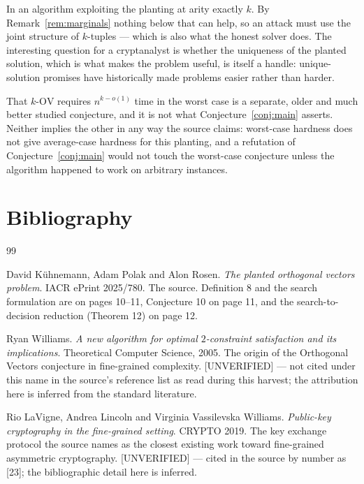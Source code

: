 \documentclass{aicr-conjecture}
\newcommand{\kOV}{k\text{-}\mathrm{OV}}
\begin{document}
\begin{remark}\label{rem:refutation}
In an algorithm exploiting the planting at arity exactly $k$. By
Remark~\ref{rem:marginals} nothing below that can help, so an attack must
use the joint structure of $k$-tuples --- which is also what the honest
solver does. The interesting question for a cryptanalyst is whether the
uniqueness of the planted solution, which is what makes the problem
useful, is itself a handle: unique-solution promises have historically
made problems easier rather than harder.
\end{remark}

\begin{remark}\label{rem:worstcase}
That $\kOV$ requires $n^{k-o(1)}$ time in the worst case is a separate,
older and much better studied conjecture, and it is not what
Conjecture~\ref{conj:main} asserts. Neither implies the other in any way
the source claims: worst-case hardness does not give average-case
hardness for this planting, and a refutation of
Conjecture~\ref{conj:main} would not touch the worst-case conjecture
unless the algorithm happened to work on arbitrary instances.
\end{remark}

\section{Bibliography}

\begin{aicrbibliography}{99}

David K\"uhnemann, Adam Polak and Alon Rosen.
\emph{The planted orthogonal vectors problem}.
IACR ePrint 2025/780.
The source. Definition 8 and the search formulation are on pages 10--11,
Conjecture 10 on page 11, and the search-to-decision reduction
(Theorem 12) on page 12.

Ryan Williams.
\emph{A new algorithm for optimal $2$-constraint satisfaction and its
implications}.
Theoretical Computer Science, 2005.
The origin of the Orthogonal Vectors conjecture in fine-grained
complexity. [UNVERIFIED] --- not cited under this name in the source's
reference list as read during this harvest; the attribution here is
inferred from the standard literature.

Rio LaVigne, Andrea Lincoln and Virginia Vassilevska Williams.
\emph{Public-key cryptography in the fine-grained setting}.
CRYPTO 2019.
The key exchange protocol the source names as the closest existing work
toward fine-grained asymmetric cryptography. [UNVERIFIED] --- cited in the
source by number as [23]; the bibliographic detail here is inferred.

\end{aicrbibliography}
\end{document}
